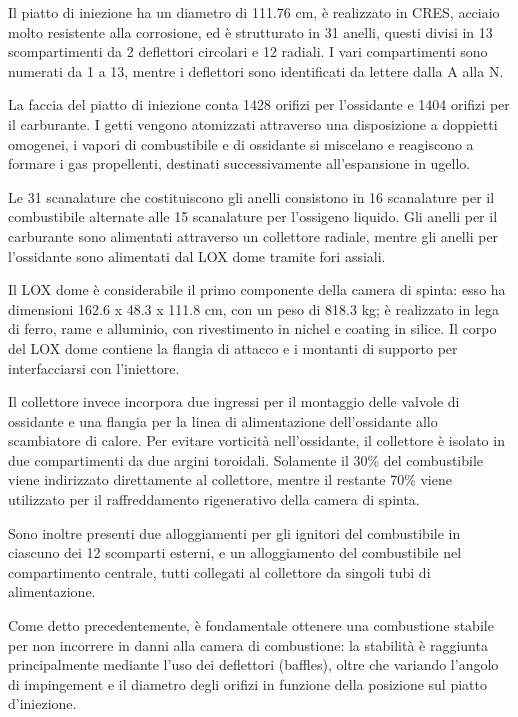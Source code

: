 \documentclass[11pt,a4paper]{article}
\begin{document}
Il piatto di iniezione ha un diametro di 111.76 cm, è realizzato in CRES, acciaio molto resistente alla corrosione, ed è strutturato in 31 anelli, questi divisi in 13 scompartimenti da 2 deflettori circolari e 12 radiali. I vari compartimenti sono numerati da 1 a 13, mentre i deflettori sono identificati da lettere dalla A alla N.

La faccia del piatto di iniezione conta 1428 orifizi per l’ossidante e 1404 orifizi per il carburante. I getti vengono atomizzati attraverso una disposizione a doppietti omogenei, i vapori di combustibile e di ossidante si miscelano e reagiscono a formare i gas propellenti, destinati successivamente all’espansione in ugello.

Le 31 scanalature che costituiscono gli anelli consistono in 16 scanalature per il combustibile alternate alle 15 scanalature per l’ossigeno liquido. Gli anelli per il carburante sono alimentati attraverso un collettore radiale, mentre gli anelli per l’ossidante sono alimentati dal LOX dome tramite fori assiali.

Il LOX dome è considerabile il primo componente della camera di spinta: esso ha dimensioni 162.6 x 48.3 x 111.8 cm, con un peso di 818.3 kg; è realizzato in lega di ferro, rame e alluminio, con rivestimento in nichel e coating in silice. Il corpo del LOX dome contiene la flangia di attacco e i montanti di supporto per interfacciarsi con l’iniettore.

Il collettore invece incorpora due ingressi per il montaggio delle valvole di ossidante e una flangia per la linea di alimentazione dell’ossidante allo scambiatore di calore. Per evitare vorticità nell’ossidante, il collettore è isolato in due compartimenti da due argini toroidali. Solamente il 30\% del combustibile viene indirizzato direttamente al collettore, mentre il restante 70\% viene utilizzato per il raffreddamento rigenerativo della camera di spinta.

Sono inoltre presenti due alloggiamenti per gli ignitori del combustibile in ciascuno dei 12 scomparti esterni, e un alloggiamento del combustibile nel compartimento centrale, tutti collegati al collettore da singoli tubi di alimentazione.

Come detto precedentemente, è fondamentale ottenere una combustione stabile per non incorrere in danni alla camera di combustione: la stabilità è raggiunta principalmente mediante l’uso dei deflettori (baffles), oltre che variando l’angolo di impingement e il diametro degli orifizi in funzione della posizione sul piatto d’iniezione.
\end{document}
